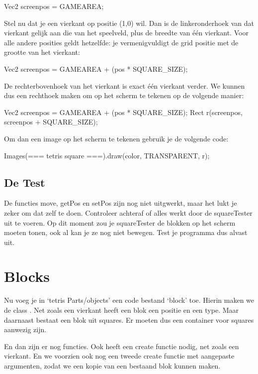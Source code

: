 \begin{code}
Vec2 screenpos = GAMEAREA;\end{code}

Stel nu dat je een vierkant op positie (1,0) wil. Dan is de linkeronderhoek van dat vierkant gelijk aan die van het speelveld, plus de breedte van \'e\'en vierkant. Voor alle andere posities geldt hetzelfde: je vermenigvuldigt de grid positie met de grootte van het vierkant:

\begin{code}
Vec2 screenpos = GAMEAREA + (pos * SQUARE_SIZE);
\end{code}

De rechterbovenhoek van het vierkant is exact \'e\'en vierkant verder. We kunnen dus een rechthoek maken om op het scherm te tekenen op de volgende manier:

\begin{code}
Vec2 screenpos = GAMEAREA + (pos * SQUARE_SIZE);
Rect r(screenpos, screenpos + SQUARE_SIZE);
\end{code}

Om dan een image op het scherm te tekenen gebruik je de volgende code: 

\begin{code}
Images(=== tetris square ===).draw(color, TRANSPARENT, r);
\end{code}

\subsection{De Test}

De functies move, getPos en setPos zijn nog niet uitgwerkt, maar het lukt je zeker om dat zelf te doen. Controleer achteraf of alles werkt door de squareTester uit te voeren. Op dit moment zou je squareTester de blokken op het scherm moeten tonen, ook al kan je ze nog niet bewegen. Test je programma dus alvast uit.


\section{Blocks}
Nu voeg je in `tetris Parts/objects' een code bestand `block' toe. Hierin maken we de class . Net zoals een vierkant heeft een blok een positie en een type. Maar daarnaast bestaat een blok uit squares. Er moeten dus een container voor squares aanwezig zijn.

En dan zijn er nog functies. Ook  heeft een create functie nodig, net zoals een vierkant. En we voorzien ook nog een tweede create functie met aangepaste argumenten, zodat we een kopie van een bestaand blok kunnen maken.

